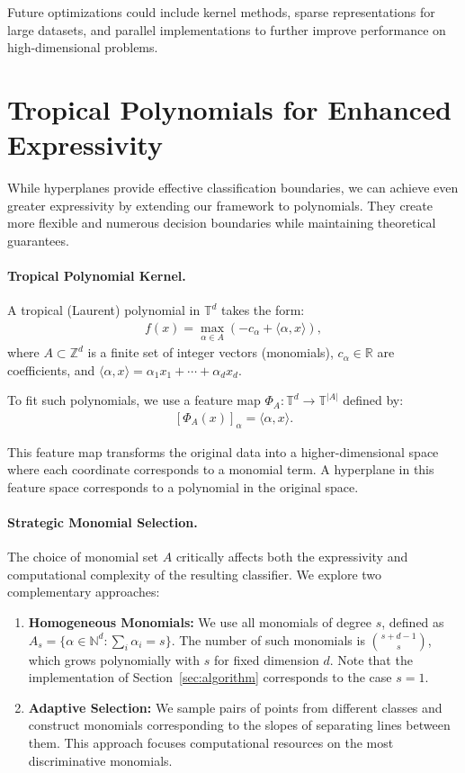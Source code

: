 \documentclass{article}
\newcommand{\R}{\mathbb{R}}
\newcommand{\trop}{\mathbb{T}}
\begin{document}
Future optimizations could include kernel methods, sparse representations for large datasets, and parallel implementations to further improve performance on high-dimensional problems.

\section{Tropical Polynomials for Enhanced Expressivity}\label{sec:polynomials}

While hyperplanes provide effective classification boundaries, we can achieve even greater expressivity by extending our framework to polynomials. They create more flexible and numerous decision boundaries while maintaining theoretical guarantees.

\paragraph{Tropical Polynomial Kernel.}
A tropical (Laurent) polynomial in $\trop^d$ takes the form:
\begin{align}
f(x) = \max_{\alpha \in A} (-c_\alpha + \langle \alpha, x \rangle),
\end{align}
where $A \subset \mathbb{Z}^d$ is a finite set of integer vectors (monomials), $c_\alpha \in \R$ are coefficients, and $\langle \alpha, x \rangle = \alpha_1 x_1 + \cdots + \alpha_d x_d$.

To fit such polynomials, we use a feature map $\Phi_A: \trop^d \to \trop^{|A|}$ defined by:
\begin{align}\label{e-def-feature}
[\Phi_A(x)]_\alpha = \langle \alpha, x \rangle.
\end{align}

This feature map transforms the original data into a higher-dimensional space where each coordinate corresponds to a monomial term. A hyperplane in this feature space corresponds to a polynomial in the original space.

\paragraph{Strategic Monomial Selection.}
The choice of monomial set $A$ critically affects both the expressivity and computational complexity of the resulting classifier. We explore two complementary approaches:

\begin{enumerate}
    \item \textbf{Homogeneous Monomials:} We use all monomials of degree $s$, defined as 
    $A_s = \{\alpha \in \mathbb{N}^d : \sum_i \alpha_i = s\}$. The number of such monomials is $\binom{s+d-1}{s}$, which grows polynomially with $s$ for fixed dimension $d$. Note that the implementation of Section~\ref{sec:algorithm} corresponds to the case $s=1$.
    
    \item \textbf{Adaptive Selection:} We sample pairs of points from different classes and construct monomials corresponding to the slopes of separating lines between them. This approach focuses computational resources on the most discriminative monomials.
\end{enumerate}
\end{document}
